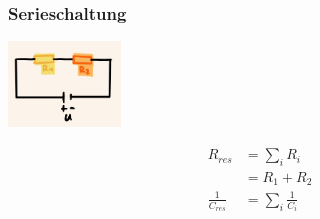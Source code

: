     \subsubsection*{Serieschaltung}
    \vspace{-1mm}
    \begin{minipage}{0.49\linewidth}
        \begin{footnotesize}
            \begin{center}
                \vspace{2mm}
                \includegraphics[width = 30mm]{src/images/serieschaltung.png}
            \end{center}
        \end{footnotesize}
    \end{minipage}
    \begin{minipage}{0.5\linewidth}
        \begin{scriptsize}
            \begin{center}
                \begin{align*}
                    R_{res} &= \sum\limits_i R_i\\
                    &= R_1 + R_2\\
                    \frac{1}{C_{res}} &= \sum\limits_i \frac{1}{C_i}
                \end{align*}
            \end{center}
        \end{scriptsize}
    \end{minipage}
    \vspace{1mm}

